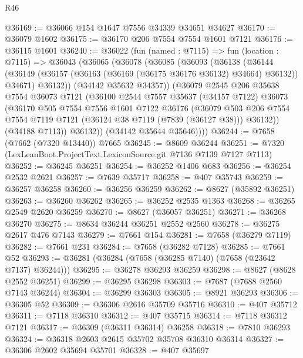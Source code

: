 \begin{lexlean}{R46}
\begin{coremodule}
@36169 := @36066 @154 @1647 @7556 @34339 @34651 @34627
@36170 := @36079 @1602
@36175 := @36170 @206 @7554 @7554 @1601 @7121
@36176 := @36115 @1601
@36240 := @36022
    (fun (named : @7115) =>
    fun (location : @7115) =>
    @36043
      (@36065
        (@36078
          (@36085
            (@36093
              (@36138
                (@36144
                  (@36149 (@36157 (@36163 (@36169 (@36175 @36176 @36132) @34664) @36132)) @34671)
                  @36132))
              (@34142 @35632 @34357))
            (@36079
              @2545
              @206
              @35638
              @7554
              @36073
              @7121
              (@36100
                @2544
                @7557
                @35637
                (@34157 @7122)
                @36073
                (@36170
                  @505
                  @7554
                  @7556
                  @1601
                  @7122
                  @36176
                  (@36079
                    @503
                    @206
                    @7554
                    @7554
                    @7119
                    @7121
                    (@36124 @38 @7119 (@7839 (@36127 @38)))
                    @36132))
                (@34188 @7113))
              @36132))
          (@34142 @35644 @35646))))
@36244 := @7658 (@7662 (@7320 @13440)) @7665
@36245 := @8609 @36244
@36251 := @7320 (LexLeanBoot.ProjectText.LexiconSource.git @7136 @7139 @7127 @7113)
@36252 := @36245 @36251
@36254 := @36252 @1406 @683
@36256 := @36254 @2532 @2621
@36257 := @7639 @35717
@36258 := @407 @35743
@36259 := @36257 @36258
@36260 := @36256 @36259
@36262 := @8627 (@35892 @36251)
@36263 := @36260 @36262
@36265 := @36252 @2535 @1363
@36268 := @36265 @2549 @2620 @36259
@36270 := @8627 (@36057 @36251)
@36271 := @36268 @36270
@36275 := @8634 @36244 @36251 @2552 @2560
@36278 := @36275 @2617 @476 @7143
@36279 := @7661 @154
@36281 := @7658 (@36279 @7119)
@36282 := @7661 @231
@36284 := @7658 (@36282 @7128)
@36285 := @7661 @52
@36293 := @36281 (@36284 (@7658 (@36285 @7140) (@7658 (@23642 @7137) @36244)))
@36295 := @36278 @36293 @36259
@36298 := @8627 (@8628 @2552 @36251)
@36299 := @36295 @36298
@36303 := @7687 (@7688 @2560 @7143 @36244)
@36304 := @36299 @36303
@36305 := @8921 @36293
@36306 := @36305 @52
@36309 := @36306 @2616 @35709 @35716
@36310 := @407 @35712
@36311 := @7118 @36310
@36312 := @407 @35715
@36314 := @7118 @36312 @7121
@36317 := @36309 (@36311 @36314) @36258
@36318 := @7810 @36293
@36324 := @36318 @2603 @2615 @35702 @35708 @36310 @36314
@36327 := @36306 @2602 @35694 @35701
@36328 := @407 @35697

\end{coremodule}
\end{lexlean}
